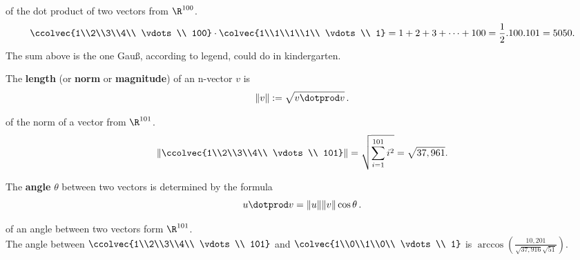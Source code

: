 \begin{example} of the dot product of two vectors from $\R^{100}$.
\[ \ccolvec{1\\2\\3\\4\\ \vdots \\ 100} \cdot 
\colvec{1\\1\\1\\1\\ \vdots \\ 1} = 1+2+3+\cdots+100=\frac12.100.101=5050.
\]
The sum above is the one Gau\ss, according to legend, could do in kindergarten.
\end{example}

\begin{definition} 
The {\bfseries length} (or {\bfseries norm} or {\bfseries magnitude}) of an n-vector $v$ is 
\[\|v\| := \sqrt{v\dotprod v }\, .\]
\end{definition} 

\begin{example} 
of the norm of a vector from $\R^{101}$.\\
\[\left\| \ccolvec{1\\2\\3\\4\\ \vdots \\ 101}\right\|
= 
\sqrt{\sum_{i=1}^{101} i^2} =   \sqrt{37,961}.
\]
\end{example}

\begin{definition} 
The {\bfseries angle} $\theta$ between two vectors is determined by the formula \[u\dotprod v = \|u\|\|v\|\cos \theta\, .\]
\end{definition}

\begin{example} of an angle between two vectors form $\R^{101}$.\\
The angle between $ \ccolvec{1\\2\\3\\4\\ \vdots \\ 101} $ and 
$
\colvec{1\\0\\1\\0\\ \vdots \\ 1} $
is
$ 
\arccos  \left( \frac{10,201 }{\sqrt{37,916} \sqrt{51} } \right).
$
\end{example}




